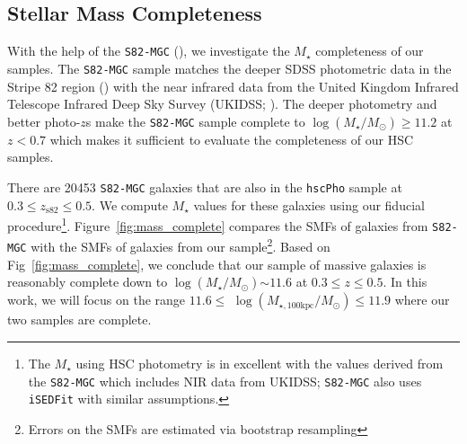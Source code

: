 \documentclass[a4paper,fleqn,usenatbib]{mnras}
\def\redm{\texttt{redMaPPer}}
\def\rbcg{\texttt{cenHighMh}}
\def\nbcg{\texttt{cenLowMh}}
\def\mstar{{$M_{\star}$}}
\def\logms{{$\log (M_{\star}/M_{\odot})$}}
\def\logmtot{{$\log (M_{\star,100\mathrm{kpc}}/M_{\odot})$}}
\begin{document}
\subsection{Stellar Mass Completeness}
    \label{ssec:complete}
    
    With the help of the \texttt{S82-MGC} (\citealt{Bundy2015}), we investigate the 
    \mstar{} completeness of our samples. 
    The \texttt{S82-MGC} sample matches the deeper SDSS photometric data in the 
    Stripe 82 region (\citealt{Annis2014}) with the near infrared data from the United 
    Kingdom Infrared Telescope Infrared Deep Sky Survey (UKIDSS; \citealt{Lawrence2007}). 
    The deeper photometry and better photo-$z$s make the \texttt{S82-MGC} sample complete 
    to \logms{}$\geq 11.2$ at $z<0.7$ which makes it sufficient to evaluate the 
    completeness of our HSC samples.
    
    There are 20453 \texttt{S82-MGC} galaxies that are also in the \texttt{hscPho} 
    sample at $0.3 \leq z_{\mathrm{s82}} \leq 0.5$. 
    We compute \mstar{} values for these galaxies using our fiducial 
    procedure\footnote{The \mstar{} using HSC photometry is in excellent with the 
    values derived from the \texttt{S82-MGC} which includes NIR data from UKIDSS; 
    \texttt{S82-MGC} also uses \texttt{iSEDFit} with similar assumptions.}. 
    Figure~\ref{fig:mass_complete} compares the SMFs of galaxies from 
    \texttt{S82-MGC} with the SMFs of galaxies from our 
    sample\footnote{Errors on the SMFs are estimated via bootstrap resampling}. 
    Based on Fig~\ref{fig:mass_complete}, we conclude that our sample of massive galaxies is 
    reasonably complete down to \logms{}${\sim} 11.6$ at $0.3 \leq z \leq 0.5$. 
    In this work, we will focus on the range $11.6 \le$ \logmtot{}$ \le 11.9$ 
    where our two samples are complete. 
    
\end{document}
